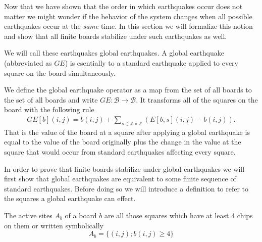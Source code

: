 \documentclass[runningheads,a4paper]{llncs}
\begin{document}
Now that we have shown that the order in which earthquakes occur does not matter we might wonder if the behavior of the system changes when all possible earthquakes occur at the \emph{same} time. In this section we will formalize this notion and show that all finite boards stabilize under such earthquakes as well.

We will call these earthquakes global earthquakes. A global earthquake (abbreviated as $GE$) is esentially to a standard earthquake applied to every square on the board simultaneously.
\begin{definition} We define the global earthquake operator as a map from the set of all boards to the set of all boards and write $GE: \mathcal{B} \rightarrow \mathcal{B}$. 
It transforms all of the squares on the board with the following rule
\begin{align*}
GE[b](i,j) = b(i,j) +\sum_{s \in \mathbb{Z} \times \mathbb{Z}} (E[b, s](i,j) - b(i,j)).
\end{align*}
That is the value of the board at a square after applying a global earthquake is equal to the value of the board originally plus the change in the value at the square that would occur from standard earthquakes affecting every square.  
\end{definition}

In order to prove that finite boards stabilize under global earthquakes we will first show that global earthquakes are equivalent to some finite sequence of standard earthquakes. Before doing so we will introduce a definition to refer to the squares a global earthquake can effect.

\begin{definition} The active sites $A_b$ of a board $b$ are all those squares which have at least 4 chips on them or written symbolically
\begin{equation*}
A_b=\{ (i,j); b(i,j) \geq 4 \}
\end{equation*}
\end{definition}
\end{document}
